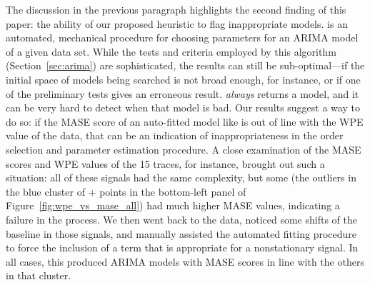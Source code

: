 The discussion in the previous paragraph highlights the second finding
of this paper: the ability of our proposed heuristic to flag
inappropriate models.  \arima is an automated, mechanical procedure
for choosing parameters for an ARIMA model of a given data set.  While
the tests and criteria employed by this algorithm
(Section~\ref{sec:arima}) are sophisticated, the results can still be
sub-optimal---if the initial space of models being searched is not
broad enough, for instance, or if one of the preliminary tests gives
an erroneous result.  \arima \emph{always} returns a model, and it can
be very hard to detect when that model is bad.  Our results suggest a
way to do so: if the MASE score of an auto-fitted model like \arima is
out of line with the WPE value of the data, that can be an indication
of inappropriateness in the order selection and parameter estimation
procedure.  A close examination of the \arima MASE scores and WPE
values of the 15 \col traces, for instance, brought out such a
situation: all of these signals had the same complexity, but some (the
outliers in the blue cluster of {\color{blue}$+$} points in the
bottom-left panel of Figure~\ref{fig:wpe_vs_mase_all}) had much higher
MASE values, indicating a failure in the \arima process.  We then went
back to the data, noticed some shifts of the baseline in those
signals, and manually assisted the automated fitting procedure to
force the inclusion of a term that is appropriate for a nonstationary
signal.  In all cases, this produced ARIMA models with MASE scores in
line with the others in that cluster.

